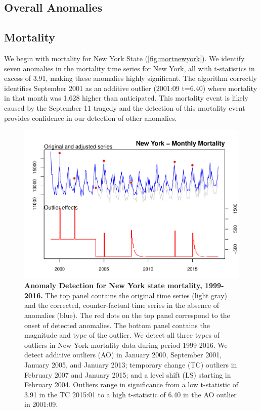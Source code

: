 \documentclass[12pt]{article}
\begin{document}
\hypertarget{overall-anomalies}{%
\subsection{Overall Anomalies}\label{overall-anomalies}}

\hypertarget{mortality}{%
\subsection{Mortality}\label{mortality}}

We begin with mortality for New York State (\autoref{fig:mortnewyork}).
We identify seven anomalies in the mortality time series for New York,
all with t-statistics in excess of 3.91, making these anomalies highly
significant. The algorithm correctly identifies September 2001 as an
additive outlier (2001:09 t=6.40) where mortality in that month was
1,628 higher than anticipated. This mortality event is likely caused by
the September 11 tragedy and the detection of this mortality event
provides confidence in our detection of other anomalies.

\begin{figure}
\centering
\includegraphics{manuscript_files/figure-latex/MortalityNewYork-1.pdf}
\caption{\textbf{Anomaly Detection for New York state mortality, 1999-2016.}
The top panel contains the original time series (light gray) and the
corrected, counter-factual time series in the absence of anomalies
(blue). The red dots on the top panel correspond to the onset of
detected anomalies. The bottom panel contains the magnitude and type of
the outlier. We detect all three types of outliers in New York mortality
data during period 1999-2016. We detect additive outliers (AO) in
January 2000, September 2001, January 2005, and January 2013; temporary
change (TC) outliers in February 2007 and January 2015; and a level
shift (LS) starting in February 2004. Outliers range in significance
from a low t-statistic of 3.91 in the TC 2015:01 to a high t-statistic
of 6.40 in the AO outlier in 2001:09. \label{fig:mortnewyork}}
\end{figure}
\end{document}

